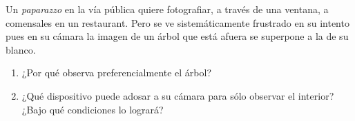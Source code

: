 \item Un \emph{paparazzo} en la vía pública quiere fotografiar, a través de una ventana, a comensales en un restaurant.
Pero se ve sistemáticamente frustrado en su intento pues en su cámara la imagen de un árbol que está afuera se superpone a la de su blanco.
\begin{enumerate}
	\item ¿Por qué observa preferencialmente el árbol?
	\item ¿Qué dispositivo puede adosar a su cámara para sólo observar el interior?
	¿Bajo qué condiciones lo logrará?
\end{enumerate}
